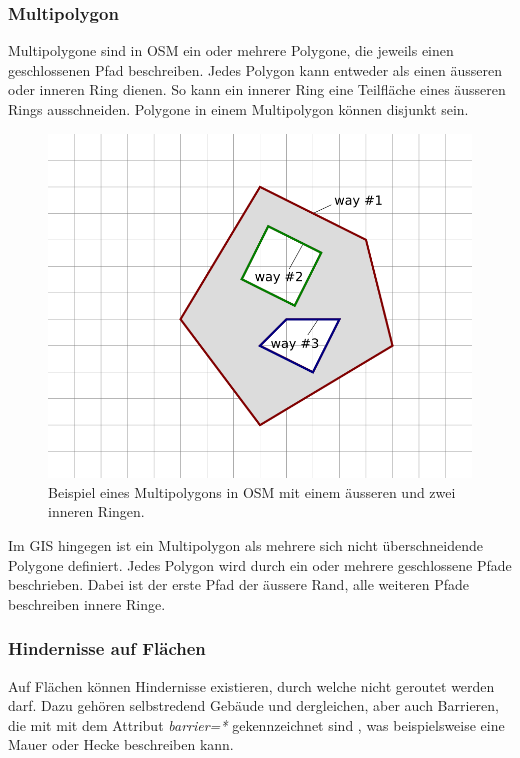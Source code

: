 \subsubsection{Multipolygon}
\label{Multipolygon}

Multipolygone sind in \ac{OSM} ein oder mehrere Polygone, die jeweils einen geschlossenen Pfad beschreiben. Jedes Polygon kann entweder als einen äusseren oder inneren Ring dienen. So kann ein innerer Ring eine Teilfläche eines äusseren Rings ausschneiden. Polygone in einem Multipolygon können disjunkt sein. \cite{osm_wiki_multipolygon}

\begin{figure}[th]
\centering
\includegraphics[width=0.5\linewidth]{technicalreport/img/multipolygon_osm_example.png}
\caption[Multipolygon OSM Example]{Beispiel eines Multipolygons in \ac{OSM} mit einem äusseren und zwei inneren Ringen. \cite{osm_wiki_multipolygon}}
\label{fig:multipolygon_osm_example}
\end{figure}

Im \ac{GIS} hingegen ist ein Multipolygon als mehrere sich nicht überschneidende Polygone definiert. Jedes Polygon wird durch ein oder mehrere geschlossene Pfade beschrieben. Dabei ist der erste Pfad der äussere Rand, alle weiteren Pfade beschreiben innere Ringe. \cite{opengis_simple_features}

\subsubsection{Hindernisse auf Flächen}
\label{Hindernisse in Flächen}

Auf Flächen können Hindernisse existieren, durch welche nicht geroutet werden darf. Dazu gehören selbstredend Gebäude und dergleichen, aber auch Barrieren, die mit  mit dem Attribut \textit{barrier=*} gekennzeichnet sind \cite{osm_wiki_barrier}, was beispielsweise eine Mauer oder Hecke beschreiben kann.

